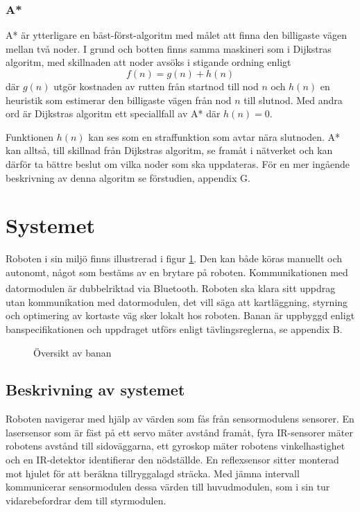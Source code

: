 \documentclass[11pt]{article}
\begin{document}
\begin{flushleft}
\subsubsection{A*}
A* är ytterligare en bäst-först-algoritm med målet att finna den billigaste vägen mellan två noder. I grund och botten finns samma maskineri som i Dijkstras algoritm, med skillnaden att noder avsöks i stigande ordning enligt
\begin{equation*}
	f(n) = g(n) + h(n)
\end{equation*}
där $g(n)$ utgör kostnaden av rutten från startnod till nod $n$ och $h(n)$ en heuristik som estimerar den billigaste vägen från nod $n$ till slutnod. Med andra ord är Dijkstras algoritm ett speciallfall av A* där $h(n) = 0$.

Funktionen $h(n)$ kan ses som en straffunktion som avtar nära slutnoden. A* kan alltså, till skillnad från Dijkstras algoritm, se framåt i nätverket och kan därför ta bättre beslut om vilka noder som ska uppdateras. För en mer ingående beskrivning av denna algoritm se förstudien, appendix G.

\pagebreak

\section{Systemet}
Roboten i sin miljö finns illustrerad i figur \ref{system}. Den kan både köras manuellt och autonomt, något som bestäms av en brytare på roboten. Kommunikationen med datormodulen är dubbelriktad via Bluetooth\textsuperscript{\circledR}. Roboten ska klara sitt uppdrag utan kommunikation med datormodulen, det vill säga att kartläggning, styrning och optimering av kortaste väg sker lokalt hos roboten. Banan är uppbyggd enligt banspecifikationen och uppdraget utförs enligt tävlingsreglerna, se appendix B.

\begin{figure}[htbp]
\centering
\noindent\resizebox{.8\linewidth}{!}{
	}
	\caption{Översikt av banan\label{system}}	
\end{figure}

\subsection{Beskrivning av systemet}

Roboten navigerar med hjälp av värden som fås från sensormodulens sensorer. En lasersensor som är fäst på ett servo mäter avstånd framåt, fyra IR-sensorer mäter robotens avstånd till sidoväggarna, ett gyroskop mäter robotens vinkelhastighet och en IR-detektor identifierar den nödställde. En reflexsensor sitter monterad mot hjulet för att beräkna tillryggalagd sträcka. Med jämna intervall kommunicerar sensormodulen dessa värden till huvudmodulen, som i sin tur vidarebefordrar dem till styrmodulen. 



\end{flushleft}
\end{document}
